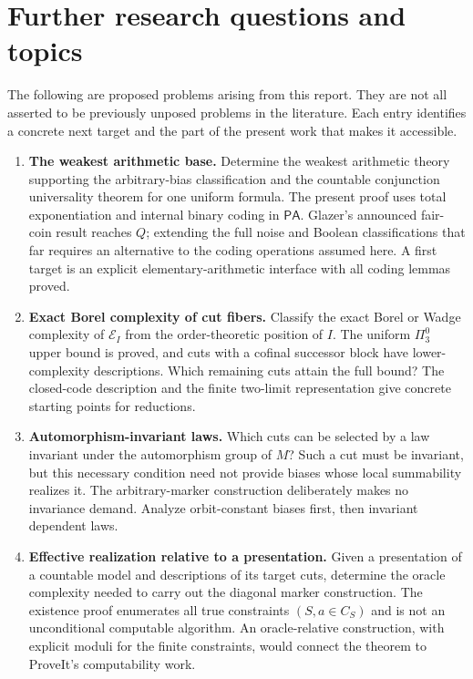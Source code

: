 \documentclass[11pt]{article}
\numberwithin{equation}{section}
\theoremstyle{definition}
\theoremstyle{remark}
\newcommand{\PA}{\mathsf{PA}}
\begin{document}
\section{Further research questions and topics}
\label{rbc:sec:questions}

The following are proposed problems arising from this report. They are
not all asserted to be previously unposed problems in the literature.
Each entry identifies a concrete next target and the part of the present
work that makes it accessible.

\begin{enumerate}[label=\textbf{Q\arabic*.},ref=Q\arabic*,leftmargin=*]
\item \textbf{The weakest arithmetic base.}\label{rbc:q:base}
Determine the weakest arithmetic theory supporting the arbitrary-bias
classification and the countable conjunction universality theorem for one
uniform formula. The present proof uses total exponentiation and internal
binary coding in $\PA$. Glazer's announced fair-coin result reaches $Q$;
extending the full noise and Boolean classifications that far requires
an alternative to the coding operations assumed here. A first target is
an explicit elementary-arithmetic interface with all coding lemmas proved.

\item \textbf{Exact Borel complexity of cut fibers.}\label{rbc:q:borel}
Classify the exact Borel or Wadge complexity of $\mathcal E_I$ from the
order-theoretic position of $I$. The uniform $\Pi^0_3$ upper bound is
proved, and cuts with a cofinal successor block have lower-complexity
descriptions. Which remaining cuts attain the full bound? The closed-code
description and the finite two-limit representation give concrete
starting points for reductions.

\item \textbf{Automorphism-invariant laws.}\label{rbc:q:invariant}
Which cuts can be selected by a law invariant under the automorphism
group of $M$? Such a cut must be invariant, but this necessary condition
need not provide biases whose local summability realizes it. The
arbitrary-marker construction deliberately makes no invariance demand.
Analyze orbit-constant biases first, then invariant dependent laws.

\item \textbf{Effective realization relative to a presentation.}\label{rbc:q:effective}
Given a presentation of a countable model and descriptions of its target
cuts, determine the oracle complexity needed to carry out the diagonal
marker construction. The existence proof enumerates all true constraints
$(S,a\in C_S)$ and is not an unconditional computable algorithm. An
oracle-relative construction, with explicit moduli for the finite
constraints, would connect the theorem to ProveIt's computability work.


\end{enumerate}
\end{document}
